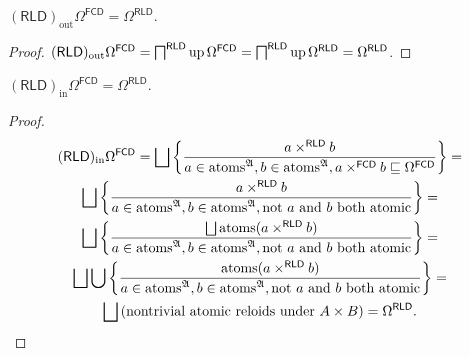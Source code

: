\begin{prop}
  $(\mathsf{RLD})_{\operatorname{out}} \Omega^{\mathsf{FCD}} =
  \Omega^{\mathsf{RLD}}$.
\end{prop}

\begin{proof}
  $(\mathsf{RLD})_{\operatorname{out}} \Omega^{\mathsf{FCD}} =
  \bigsqcap^{\mathsf{RLD}} \operatorname{up} \Omega^{\mathsf{FCD}} =
  \bigsqcap^{\mathsf{RLD}} \operatorname{up} \Omega^{\mathsf{RLD}} =
  \Omega^{\mathsf{RLD}}$.
\end{proof}

\begin{prop}
  $(\mathsf{RLD})_{\operatorname{in}} \Omega^{\mathsf{FCD}} = \Omega^{\mathsf{RLD}}$.
\end{prop}

\begin{proof}
  \begin{multline*}
  (\mathsf{RLD})_{\operatorname{in}} \Omega^{\mathsf{FCD}} = \bigsqcup
  \setcond{ a \times^{\mathsf{RLD}} b }{ a \in
  \atoms^{\mathfrak{A}}, b \in \atoms^{\mathfrak{A}}, a
  \times^{\mathsf{FCD}} b \sqsubseteq \Omega^{\mathsf{FCD}}
  } = \\
  \bigsqcup \setcond{ a \times^{\mathsf{RLD}} b }{
  a \in \atoms^{\mathfrak{A}}, b \in
  \atoms^{\mathfrak{A}}, \text{not $a$ and $b$ both atomic} } = \\
  \bigsqcup \setcond{ \bigsqcup \atoms (a \times^{\mathsf{RLD}} b)
  }{ a \in \atoms^{\mathfrak{A}}, b \in
  \atoms^{\mathfrak{A}}, \text{not $a$ and $b$ both atomic} } = \\
  \bigsqcup \bigcup \setcond{ \atoms (a \times^{\mathsf{RLD}} b) }{
  a \in \atoms^{\mathfrak{A}}, b \in
  \atoms^{\mathfrak{A}}, \text{not $a$ and $b$ both atomic} } = \\
  \bigsqcup \left( \text{nontrivial atomic reloids under $A \times B$} \right) =
  \Omega^{\mathsf{RLD}}.
  \end{multline*}
\end{proof}
